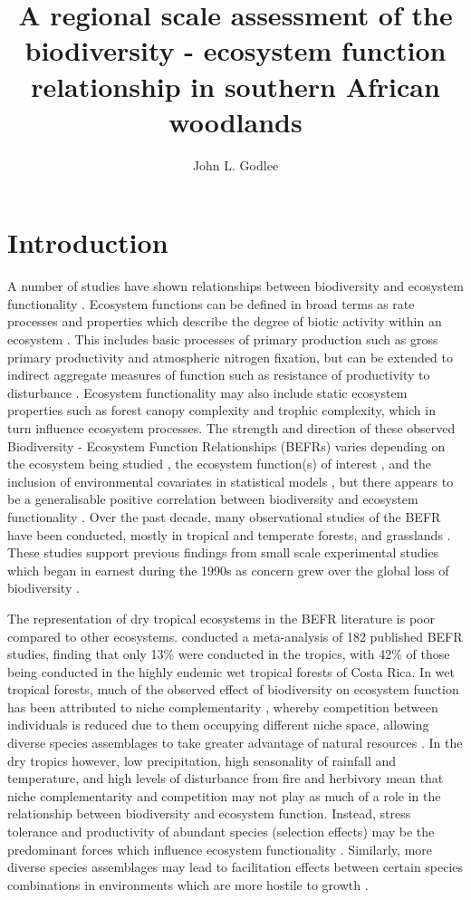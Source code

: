 \documentclass[11pt,a4paper]{article}
\title{A regional scale assessment of the biodiversity - ecosystem function relationship in southern African woodlands}
\author{John L. Godlee}
\date{}
\begin{document}
\maketitle
\tableofcontents

\section{Introduction}

A number of studies have shown relationships between biodiversity and ecosystem functionality \citep{Review}. Ecosystem functions can be defined in broad terms as rate processes and properties which describe the degree of biotic activity within an ecosystem \citep{Jax2005}. This includes basic processes of primary production such as gross primary productivity and atmospheric nitrogen fixation, but can be extended to indirect aggregate measures of function such as resistance of productivity to disturbance \citep{}. Ecosystem functionality may also include static ecosystem properties such as forest canopy complexity and trophic complexity, which in turn influence ecosystem processes. The strength and direction of these observed Biodiversity - Ecosystem Function Relationships (BEFRs) varies depending on the ecosystem being studied \citep{}, the ecosystem function(s) of interest \citep{}, and the inclusion of environmental covariates in statistical models \citep{}, but there appears to be a generalisable positive correlation between biodiversity and ecosystem functionality \citep{Liang2016}. Over the past decade, many observational studies of the BEFR have been conducted, mostly in tropical and temperate forests, and grasslands \citep{Chen2011}. These studies support previous findings from small scale experimental studies which began in earnest during the 1990s as concern grew over the global loss of biodiversity \citep{Tilman1994, Tilman2014}.

The representation of dry tropical ecosystems in the BEFR literature is poor compared to other ecosystems. \citet{Clarke2017} conducted a meta-analysis of 182 published BEFR studies, finding that only 13\% were conducted in the tropics, with 42\% of those being conducted in the highly endemic wet tropical forests of Costa Rica. In wet tropical forests, much of the observed effect of biodiversity on ecosystem function has been attributed to niche complementarity \citep{}, whereby competition between individuals is reduced due to them occupying different niche space, allowing diverse species assemblages to take greater advantage of natural resources \citep{}. In the dry tropics however, low precipitation, high seasonality of rainfall and temperature, and high levels of disturbance from fire and herbivory mean that niche complementarity and competition may not play as much of a role in the relationship between biodiversity and ecosystem function. Instead, stress tolerance and productivity of abundant species (selection effects) may be the predominant forces which influence ecosystem functionality \citep{}. Similarly, more diverse species assemblages may lead to facilitation effects between certain species combinations in environments which are more hostile to growth \citep{}.
\end{document}
